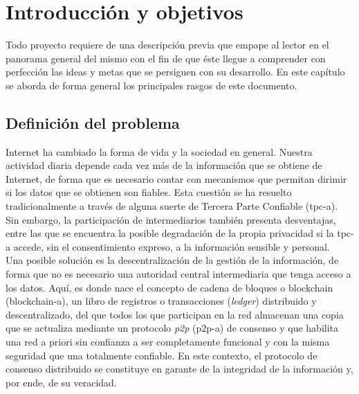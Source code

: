 \documentclass[12pt,a4paper, twoside]{report}
\begin{document}
	\setlength{\headwidth}{17.5cm}
	\renewcommand{\headrulewidth}{1.3pt}
	\setlength{\headsep}{1.1cm}
		
	\chapter{Introducción y objetivos} \label{introductionChapter}
		
	
	Todo proyecto requiere de una descripción previa que empape al lector en el panorama general del mismo con el fin de que éste llegue a comprender con perfección las ideas y metas que se persiguen con su desarrollo. En este capítulo se aborda de forma general los principales rasgos de este documento.
		
	\section{Definición del problema}
		
	Internet ha cambiado la forma de vida y la sociedad en general. Nuestra actividad diaria depende cada vez más de la información que se obtiene de Internet, de forma que es necesario contar con mecanismos que permitan dirimir si los datos que se obtienen son fiables. Esta cuestión se ha resuelto tradicionalmente a través de alguna suerte de Tercera Parte Confiable (\gls{tpc-a}). Sin embargo, la participación de intermediarios también presenta desventajas, entre las que se encuentra la posible degradación de la propia privacidad si la \gls{tpc-a} accede, sin el consentimiento expreso, a la información sensible y personal. \\
	
	Una posible solución es la descentralización de la gestión de la información, de forma que no es necesario una autoridad central intermediaria que tenga acceso a los datos. Aquí, es donde nace el concepto de cadena de bloques o \Gls{blockchain} (\gls{blockchain-a}), un libro de registros o transacciones (\textit{ledger}) distribuido y descentralizado, del que todos los que participan en la red almacenan una copia que se actualiza mediante un protocolo \textit{\gls{p2p}} (\gls{p2p-a}) de consenso y que habilita una red a priori sin confianza a ser completamente funcional y con la misma seguridad que una totalmente confiable. En este contexto, el protocolo de consenso distribuido se constituye en garante de la integridad de la información y, por ende, de su veracidad. \\
\end{document}
